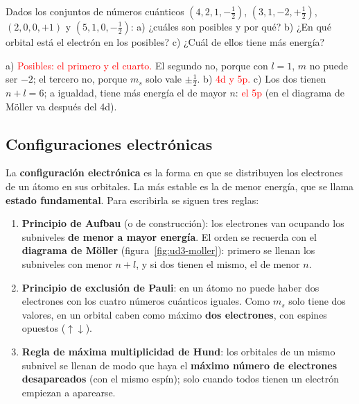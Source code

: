 \begin{exercise}
    Dados los conjuntos de números cuánticos \((4, 2, 1, -\frac{1}{2})\), \((3, 1, -2, +\frac{1}{2})\), \((2, 0, 0, +1)\) y
    \((5, 1, 0, -\frac{1}{2})\): a) ¿cuáles son posibles y por qué? b) ¿En qué orbital está el electrón en los posibles?
    c) ¿Cuál de ellos tiene más energía?
    \begin{solu}
        a) \textcolor{red}{Posibles: el primero y el cuarto.} El segundo no, porque con \(l = 1\), \(m\) no puede ser \(-2\); el
        tercero no, porque \(m_s\) solo vale \(\pm\frac{1}{2}\). b) \textcolor{red}{4d y 5p.} c) Los dos tienen \(n + l = 6\); a
        igualdad, tiene más energía el de mayor \(n\): \textcolor{red}{el 5p} (en el diagrama de Möller va después del 4d).
    \end{solu}
\end{exercise}

\subsection{Configuraciones electrónicas}

La \textbf{configuración electrónica} es la forma en que se distribuyen los electrones de un átomo en sus orbitales. La más
estable es la de menor energía, que se llama \textbf{estado fundamental}. Para escribirla se siguen tres reglas:

\begin{definition}
    \leavevmode %
    \begin{enumerate}
        \item \textbf{Principio de Aufbau} (o de construcción): los electrones van ocupando los subniveles \textbf{de menor a mayor
        energía}. El orden se recuerda con el \textbf{diagrama de Möller} (figura~\ref{fig:ud3-moller}): primero se llenan los
        subniveles con menor \(n + l\), y si dos tienen el mismo, el de menor \(n\).
        \item \textbf{Principio de exclusión de Pauli}: en un átomo no puede haber dos electrones con los cuatro números cuánticos
        iguales. Como \(m_s\) solo tiene dos valores, en un orbital caben como máximo \textbf{dos electrones}, con espines
        opuestos (\(\uparrow\downarrow\)).
        \item \textbf{Regla de máxima multiplicidad de Hund}: los orbitales de un mismo subnivel se llenan de modo que haya el
        \textbf{máximo número de electrones desapareados} (con el mismo espín); solo cuando todos tienen un electrón empiezan a
        aparearse.
    \end{enumerate}
\end{definition}


